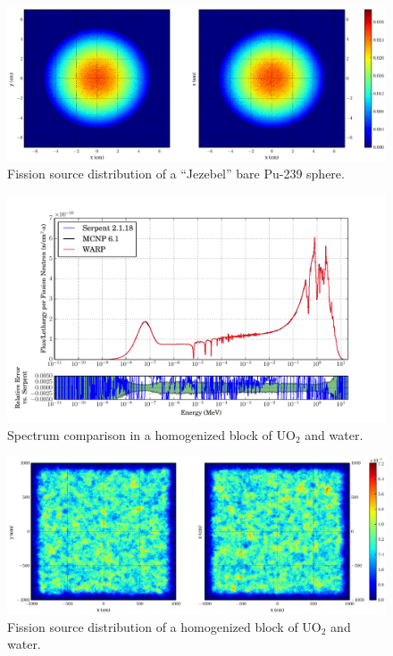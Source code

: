 \begin{figure}[h!]
\centering
\includegraphics[width=\textwidth,trim= 5cm 0cm 7cm 0cm]{graphics/finalresults/godiva_fiss-6.eps}
\caption{Fission source distribution of a ``Jezebel'' bare Pu-239 sphere. \label{godiva_fiss} }
\end{figure}

\begin{figure}[h!] 
\centering
\includegraphics[width=\textwidth,trim= 1cm 0cm 1cm 0cm]{graphics/finalresults/homfuel_spec-6.pdf}
\caption{Spectrum comparison in a homogenized block of UO$_2$ and water. \label{homfuel_spec} }
\end{figure}

\begin{figure}[h!]
\centering
\includegraphics[width=\textwidth,trim= 5cm 0cm 7cm 0cm]{graphics/finalresults/homfuel_fiss-6.eps}
\caption{Fission source distribution of a homogenized block of UO$_2$ and water. \label{homfuel_fiss} }
\end{figure}

